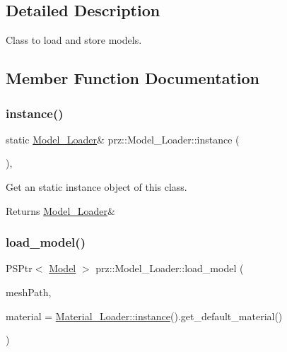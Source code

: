 \subsection{Detailed Description}
Class to load and store models. 



\subsection{Member Function Documentation}
\mbox{\label{classprz_1_1_model___loader_a377fe640a549451ac04cffff0cf8c0d9}} 
\subsubsection{\texorpdfstring{instance()}{instance()}}
{\footnotesize\ttfamily static \mbox{\hyperlink{classprz_1_1_model___loader}{Model\+\_\+\+Loader}}\& prz\+::\+Model\+\_\+\+Loader\+::instance (\begin{DoxyParamCaption}{ }\end{DoxyParamCaption})\hspace{0.3cm}{\ttfamily [inline]}, {\ttfamily [static]}}



Get an static instance object of this class. 

\begin{DoxyReturn}{Returns}
\mbox{\hyperlink{classprz_1_1_model___loader}{Model\+\_\+\+Loader}}\& 
\end{DoxyReturn}
\mbox{\label{classprz_1_1_model___loader_a3a71609e728a26ec26b4b5da165f9b09}} 
\subsubsection{\texorpdfstring{load\_model()}{load\_model()}\hspace{0.1cm}{\footnotesize\ttfamily [1/2]}}
{\footnotesize\ttfamily P\+S\+Ptr$<$ \mbox{\hyperlink{classprz_1_1_model}{Model}} $>$ prz\+::\+Model\+\_\+\+Loader\+::load\+\_\+model (\begin{DoxyParamCaption}\item[{const P\+String \&}]{mesh\+Path,  }\item[{P\+S\+Ptr$<$ \mbox{\hyperlink{classprz_1_1_material}{Material}} $>$}]{material = {\ttfamily \mbox{\hyperlink{classprz_1_1_material___loader_a5fa3903db95525602037c029debb6532}{Material\+\_\+\+Loader\+::instance}}().get\+\_\+default\+\_\+material()} }\end{DoxyParamCaption})}




